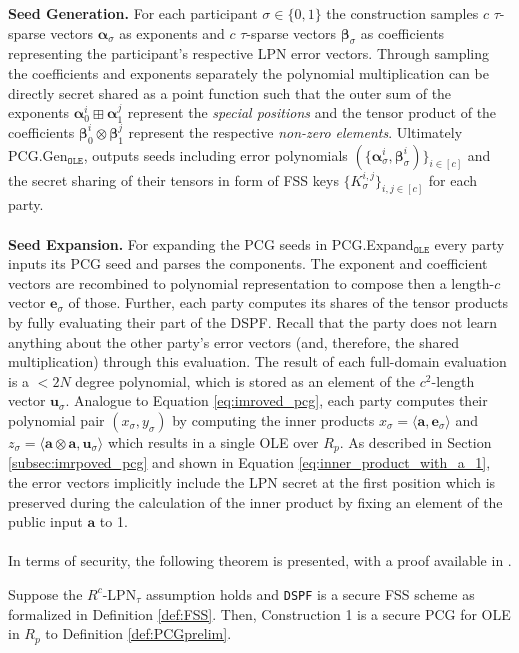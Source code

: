 \textbf{Seed Generation.} For each participant $\sigma \in \{0,1\}$ the construction samples $c$ $\tau$-sparse vectors $\boldsymbol{\alpha}_\sigma$ as exponents and $c$ $\tau$-sparse vectors $\boldsymbol{\beta}_\sigma$ as coefficients representing the participant's respective LPN error vectors. Through sampling the coefficients and exponents separately the polynomial multiplication can be directly secret shared as a point function such that the outer sum of the exponents $\boldsymbol{\alpha}_{0}^{i} \boxplus \boldsymbol{\alpha}_{1}^{j}$ represent the \textit{special positions} and the tensor product of the coefficients $\boldsymbol{\beta}_{0}^{i} \otimes \boldsymbol{\beta}_{1}^{j}$ represent the respective \textit{non-zero elements}. Ultimately PCG.Gen$_{\texttt{OLE}}$, outputs seeds including error polynomials $(\{\boldsymbol{\alpha}_\sigma^i, \boldsymbol{\beta}_\sigma^i)\}_{i\in[c]}$ and the secret sharing of their tensors in form of FSS keys $\{K_\sigma^{i,j}\}_{i,j\in[c]}$  for each party. 
\\\\
\textbf{Seed Expansion.}
For expanding the PCG seeds in PCG.Expand$_{\texttt{OLE}}$ every party inputs its PCG seed and parses the components. The exponent and coefficient vectors are recombined to polynomial representation to compose then a length-$c$ vector $\boldsymbol{e}_\sigma$ of those. Further, each party computes its shares of the tensor products by fully evaluating their part of the DSPF. Recall that the party does not learn anything about the other party's error vectors (and, therefore, the shared multiplication) through this evaluation. The result of each full-domain evaluation is a $<2N$ degree polynomial, which is stored as an element of the $c^2$-length vector $\boldsymbol{u}_\sigma$. Analogue to Equation \ref{eq:imroved_pcg}, each party computes their polynomial pair $(x_\sigma , y_\sigma)$ by computing the inner products $x_\sigma = \langle\boldsymbol{a},\boldsymbol{e}_\sigma\rangle$ and $z_\sigma = \langle\boldsymbol{a}\otimes\boldsymbol{a},\boldsymbol{u}_\sigma\rangle$ which results in a single OLE over $R_p$. As described in Section \ref{subsec:imrpoved_pcg} and shown in Equation \ref{eq:inner_product_with_a_1}, the error vectors implicitly include the LPN secret at the first position which is preserved during the calculation of the inner product by fixing an element of the public input $\boldsymbol{a}$ to 1. 
\\\\
In terms of security, the following theorem is presented, with a proof available in \cite{boyle2020efficient}.
\begin{theorem}
Suppose the $R^c$-LPN$_\tau$ assumption holds and \texttt{DSPF} is a secure FSS scheme as formalized in Definition \ref{def:FSS}. Then, Construction 1 is a secure PCG for OLE in $R_p$ to Definition \ref{def:PCGprelim}.
\label{theorem:olepcg}
\end{theorem}

